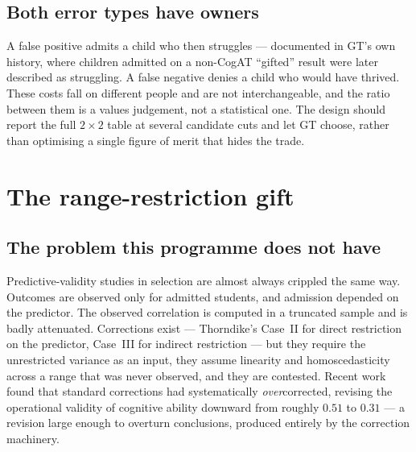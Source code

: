 \documentclass[11pt,a4paper]{article}
\begin{document}


\subsection{Both error types have owners}

A false positive admits a child who then struggles --- documented in GT's own
history, where children admitted on a non-CogAT ``gifted'' result were later
described as struggling. A false negative denies a child who would have thrived.
These costs fall on different people and are not interchangeable, and the ratio
between them is a values judgement, not a statistical one. The design should
report the full $2\times2$ table at several candidate cuts and let GT choose,
rather than optimising a single figure of merit that hides the trade.

\section{The range-restriction gift}
\label{sec:range}

\subsection{The problem this programme does not have}

Predictive-validity studies in selection are almost always crippled the same
way. Outcomes are observed only for admitted students, and admission depended on
the predictor. The observed correlation is computed in a truncated sample and is
badly attenuated. Corrections exist --- Thorndike's Case~II for direct
restriction on the predictor, Case~III for indirect restriction --- but they
require the unrestricted variance as an input, they assume linearity and
homoscedasticity across a range that was never observed, and they are
contested. Recent work found that standard corrections had systematically
\emph{over}corrected, revising the operational validity of cognitive ability
downward from roughly $0.51$ to $0.31$ --- a revision large enough to overturn
conclusions, produced entirely by the correction machinery.
\end{document}

